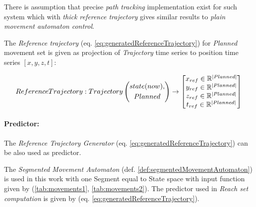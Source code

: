 There is assumption that precise \emph{path tracking} implementation exist for such system which with \emph{thick reference trajectory} gives similar results to \emph{plain movement automaton control}.

The \emph{Reference trajectory} (eq. \ref{eq:generatedReferenceTrajectory}) for \emph{Planned} movement set is given as projection  of \emph{Trajectory} time series to position time series $[x,y,z,t]$:

\begin{equation}\label{eq:generatedReferenceTrajectory}
    Reference Trajectory:Trajectory\left(\begin{gathered}state(now),\\Planned\end{gathered}\right) 
    \to 
    \begin{bmatrix}
        x_{ref} \in \mathbb{R}^{|Planned|}\\
        y_{ref} \in \mathbb{R}^{|Planned|}\\
        z_{ref} \in \mathbb{R}^{|Planned|}\\
        t_{ref} \in \mathbb{R}^{|Planned|}
    \end{bmatrix}
\end{equation}

\paragraph{Predictor:} The \emph{Reference Trajectory Generator} (eq. \ref{eq:generatedReferenceTrajectory}) can be also used as predictor. 

\begin{note}
    The \emph{Segmented Movement Automaton} (def. \ref{def:segmentedMovementAutomaton}) is used in this work with one Segment equal to State space with input function given by (\ref{tab:movements1}, \ref{tab:movements2}). The predictor used in \emph{Reach set computation} is given by (eq. \ref{eq:generatedReferenceTrajectory}).
\end{note}
